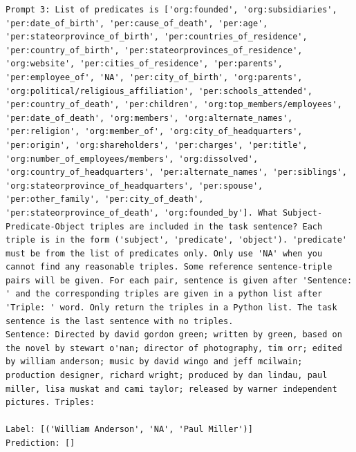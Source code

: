 \documentclass{article}
\begin{document}
\begin{lstlisting}
Prompt 3: List of predicates is ['org:founded', 'org:subsidiaries', 'per:date_of_birth', 'per:cause_of_death', 'per:age', 'per:stateorprovince_of_birth', 'per:countries_of_residence', 'per:country_of_birth', 'per:stateorprovinces_of_residence', 'org:website', 'per:cities_of_residence', 'per:parents', 'per:employee_of', 'NA', 'per:city_of_birth', 'org:parents', 'org:political/religious_affiliation', 'per:schools_attended', 'per:country_of_death', 'per:children', 'org:top_members/employees', 'per:date_of_death', 'org:members', 'org:alternate_names', 'per:religion', 'org:member_of', 'org:city_of_headquarters', 'per:origin', 'org:shareholders', 'per:charges', 'per:title', 'org:number_of_employees/members', 'org:dissolved', 'org:country_of_headquarters', 'per:alternate_names', 'per:siblings', 'org:stateorprovince_of_headquarters', 'per:spouse', 'per:other_family', 'per:city_of_death', 'per:stateorprovince_of_death', 'org:founded_by']. What Subject-Predicate-Object triples are included in the task sentence? Each triple is in the form ('subject', 'predicate', 'object'). 'predicate' must be from the list of predicates only. Only use 'NA' when you cannot find any reasonable triples. Some reference sentence-triple pairs will be given. For each pair, sentence is given after 'Sentence: ' and the corresponding triples are given in a python list after 'Triple: ' word. Only return the triples in a Python list. The task sentence is the last sentence with no triples.
Sentence: Directed by david gordon green; written by green, based on the novel by stewart o'nan; director of photography, tim orr; edited by william anderson; music by david wingo and jeff mcilwain; production designer, richard wright; produced by dan lindau, paul miller, lisa muskat and cami taylor; released by warner independent pictures. Triples:

Label: [('William Anderson', 'NA', 'Paul Miller')]
Prediction: []
\end{lstlisting}
\end{document}
